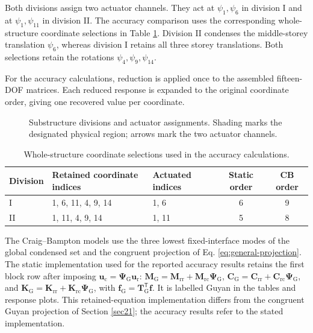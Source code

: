 \documentclass[a4paper,fleqn,review,12pt]{cas-sc}
\numberwithin{equation}{section}
\newcommand{\rev}[1]{{\color{red}#1}}
\begin{document}
\rev{Both divisions assign two actuator channels. They act at \(\psi_1,\psi_6\) in division I and at \(\psi_1,\psi_{11}\) in division II. The accuracy comparison uses the corresponding whole-structure coordinate selections in Table \ref{tab:dof-sets}. Division II condenses the middle-storey translation \(\psi_6\), whereas division I retains all three storey translations. Both selections retain the rotations \(\psi_4,\psi_9,\psi_{14}\).}

\rev{For the accuracy calculations, reduction is applied once to the assembled fifteen-DOF matrices. Each reduced response is expanded to the original coordinate order, giving one recovered value per coordinate.}

\begin{figure}[htbp]
	\centering
	
\caption{\rev{Substructure divisions and actuator assignments. Shading marks the designated physical region; arrows mark the two actuator channels.}}


\label{fig:division}
\end{figure}

\begin{table}[htbp]
\centering
\caption{\rev{Whole-structure coordinate selections used in the accuracy calculations.}}
\label{tab:dof-sets}
{\color{red}
\begin{tabular}{lllcc}
\toprule
Division & Retained coordinate indices & Actuated indices & Static order & CB order\\
\midrule
I & 1, 6, 11, 4, 9, 14 & 1, 6 & 6 & 9\\
II & 1, 11, 4, 9, 14 & 1, 11 & 5 & 8\\
\bottomrule
\end{tabular}}
\end{table}

\rev{The Craig--Bampton models use the three lowest fixed-interface modes of the global condensed set and the congruent projection of Eq. \eqref{eq:general-projection}. The static implementation used for the reported accuracy results retains the first block row after imposing \(\bm u_{\mathrm c}=\bm\Psi_{\mathrm G}\bm u_{\mathrm r}\):
\(\mathbf M_{\mathrm G}=\mathbf M_{\mathrm{rr}}+\mathbf M_{\mathrm{rc}}\bm\Psi_{\mathrm G}\),
\(\mathbf C_{\mathrm G}=\mathbf C_{\mathrm{rr}}+\mathbf C_{\mathrm{rc}}\bm\Psi_{\mathrm G}\), and
\(\mathbf K_{\mathrm G}=\mathbf K_{\mathrm{rr}}+\mathbf K_{\mathrm{rc}}\bm\Psi_{\mathrm G}\), with
\(\bm f_{\mathrm G}=\mathbf T_{\mathrm G}^{\mathsf T}\bm f\).
It is labelled Guyan in the tables and response plots. This retained-equation implementation differs from the congruent Guyan projection of Section \ref{sec21}; the accuracy results refer to the stated implementation.}
\end{document}
